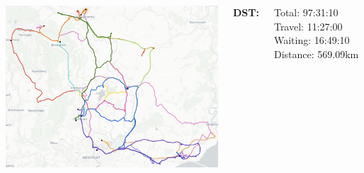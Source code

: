\documentclass[usenames,dvipsnames]{beamer}
\begin{document}
\begin{frame}
\begin{columns}
\begin{minipage}[c][0.7\textheight][c]{\linewidth}
			\includegraphics[width=1\linewidth]{figures/02MonmouthDST}
		\end{minipage}
		\begin{minipage}[c][0.2\textheight][c]{\linewidth}
			\scriptsize
			\hspace{17mm}\textbf{DST:}
			\begin{itemize}
				\setlength{\itemindent}{0.5in}
				\ditem Total: 97:31:10
				\ditem Travel: 11:27:00
				\ditem Waiting: 16:49:10
				\ditem Distance: 569.09km
			\end{itemize}
			\vspace{10mm}
		\end{minipage}
	\end{columns}
\end{frame}
\end{document}
